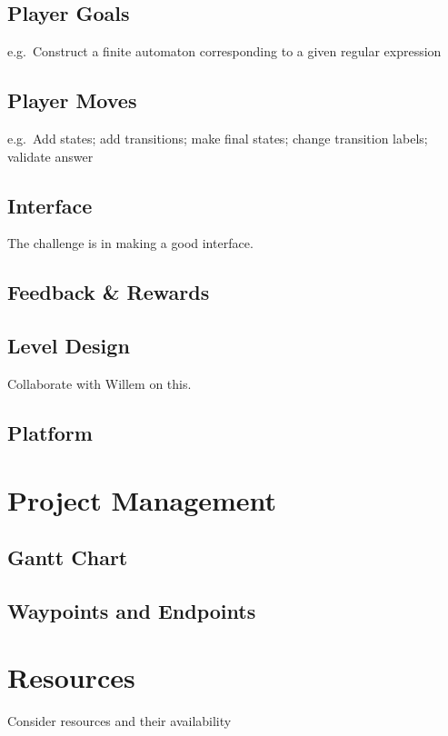 \documentclass[a4paper,11pt]{article}
\begin{document}
\subsection{Player Goals}
e.g.\ Construct a finite automaton corresponding to a given regular expression

\subsection{Player Moves}
e.g.\ Add states; add transitions; make final states; change transition labels; validate answer

\subsection{Interface}
The challenge is in making a good interface.

\subsection{Feedback \& Rewards}

\subsection{Level Design}
Collaborate with Willem on this.

\subsection{Platform}


\section{Project Management} %
\subsection{Gantt Chart}
\subsection{Waypoints and Endpoints}

\section{Resources} %
Consider resources and their availability

\newpage
\printbibliography
\end{document}
